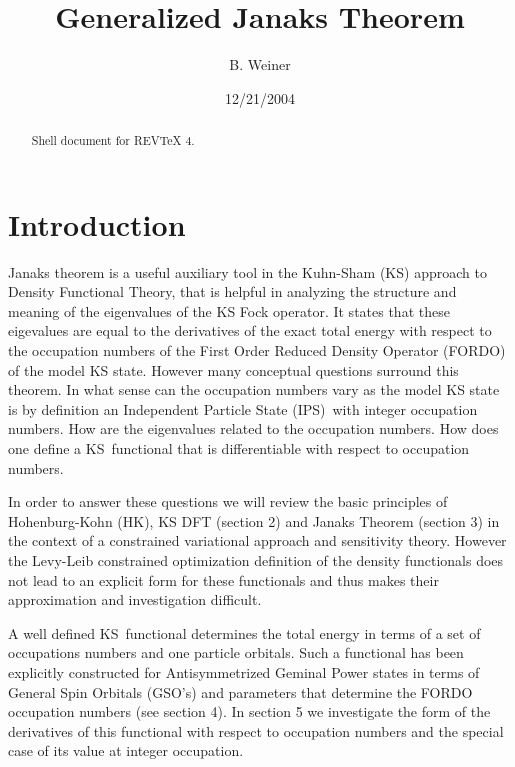 \documentclass[aps,preprint]{revtex4}%
\begin{document}
\preprint{ }
\title[Janaks Theorem]{Generalized Janaks Theorem}
\author{B. Weiner}

\begin{abstract}
Shell document for REV\TeX{} 4.

\end{abstract}
\date{12/21/2004}
\maketitle
\tableofcontents


\section{Introduction\label{Intro}}

Janaks theorem is a useful auxiliary tool in the Kuhn-Sham (KS) approach to
Density Functional Theory, that is helpful in analyzing the structure and
meaning of the eigenvalues of the KS Fock operator. It states that these
eigevalues are equal to the derivatives of the exact total energy with respect
to the occupation numbers of the First Order Reduced Density Operator (FORDO)
of the model KS state. However many conceptual questions surround this
theorem. In what sense can the occupation numbers vary as the model KS state
is by definition an Independent Particle State (IPS)\ with integer occupation
numbers. How are the eigenvalues related to the occupation numbers. How does
one define a KS\ functional that is differentiable with respect to occupation
numbers. 

In order to answer these questions we will review the basic principles of
Hohenburg-Kohn (HK), KS DFT (section 2) and Janaks Theorem (section 3) in the
context of a constrained variational approach and sensitivity theory. However
the Levy-Leib constrained optimization definition of the density functionals
does not lead to an explicit form for these functionals and thus makes their
approximation and investigation difficult.

A well defined KS\ functional determines the total energy in terms of a set of
occupations numbers and one particle orbitals. Such a functional has been
explicitly constructed \cite{Weiner&Ortiz2005} for Antisymmetrized Geminal
Power states in terms of General Spin Orbitals (GSO's) and parameters that
determine the FORDO occupation numbers (see section 4). In section 5 we
investigate the form of the derivatives of this functional with respect to
occupation numbers and the special case of its value at integer occupation.  
\end{document}
